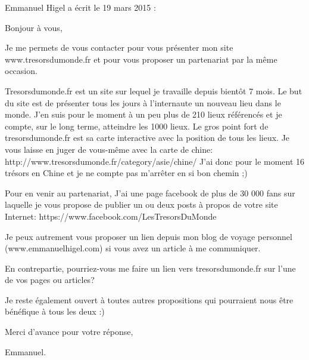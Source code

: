 \medskip
Emmanuel Higel a écrit le 19 mars 2015 :
\begin{displayquote}
Bonjour à vous,

Je me permets de vous contacter pour vous présenter mon site www.tresorsdumonde.fr et pour vous proposer un partenariat par la même occasion.

Tresorsdumonde.fr est un site sur lequel je travaille depuis bientôt 7 mois. Le but du site est de présenter tous les jours à l'internaute un nouveau lieu dans le monde.
J'en suis pour le moment à un peu plus de 210 lieux référencés et je compte, sur le long terme, atteindre les 1000 lieux.
Le gros point fort de tresorsdumonde.fr est sa carte interactive avec la position de tous les lieux. Je vous laisse en juger de vous-même avec la carte de chine:
http://www.tresorsdumonde.fr/category/asie/chine/
J'ai donc pour le moment 16 trésors en Chine et je ne compte pas m'arrêter en si bon chemin ;)

Pour en venir au partenariat, J'ai une page facebook de plus de 30 000 fans sur laquelle je vous propose de publier un ou deux posts à propos de votre site Internet:
https://www.facebook.com/LesTresorsDuMonde

Je peux autrement vous proposer un lien depuis mon blog de voyage personnel (www.emmanuelhigel.com) si vous avez un article à me communiquer.

En contrepartie, pourriez-vous me faire un lien vers tresorsdumonde.fr sur l'une de vos pages ou articles?

Je reste également ouvert à toutes autres propositions qui pourraient nous être bénéfique à tous les deux :)

Merci d'avance pour votre réponse,

Emmanuel.
\end{displayquote}

\vfill
